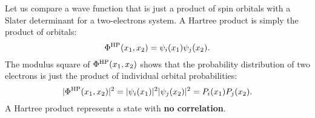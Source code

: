 \documentclass[../Main/chem532-notes.tex]{subfiles}
\begin{document}
\begin{example}
Let us compare a wave function that is just a product of spin orbitals with a Slater determinant for a two-electrons system.
A Hartree product is simply the product of orbitals:
\begin{equation}
\Phi^{\rm HP}(x_1,x_2) = \psi_i(x_1) \psi_j(x_2).
\end{equation}
The modulus square of $\Phi^{\rm HP}(x_1,x_2)$ shows that the probability distribution of two electrons is just the product of individual orbital probabilities:
\begin{equation}
| \Phi^{\rm HP}(x_1,x_2)|^2 = |\psi_i(x_1)|^2 |\psi_j(x_2)|^2 = P_i(x_1) P_j(x_2).
\end{equation}
A Hartree product represents a state with \textbf{no correlation}.


\end{example}
\end{document}
